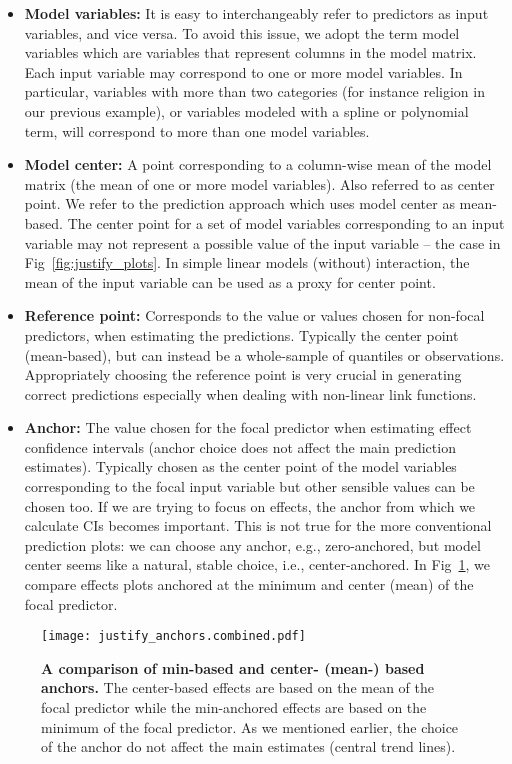 \begin{itemize}
\item \textbf{Model variables:} It is easy to interchangeably refer to predictors as input variables, and vice versa. To avoid this issue, we adopt the term model variables which are variables that represent columns in the model matrix. Each input variable may correspond to one or more model variables. In particular, variables with more than two categories (for instance religion in our previous example), or variables modeled with a spline or polynomial term, will correspond to more than one model variables.
\item \textbf{Model center:} A point corresponding to a column-wise mean of the model matrix (the mean of one or more model variables). Also referred to as center point. We refer to the prediction approach which uses model center as mean-based. The center point for a set of model variables corresponding to an input variable may not represent a possible value of the input variable -- the case in Fig~\ref{fig:justify_plots}. In simple linear models (without) interaction, the mean of the input variable can be used as a proxy for center point.
\item \textbf{Reference point:} Corresponds to the value or values chosen for non-focal predictors, when estimating the predictions. Typically the center point (mean-based), but can instead be a whole-sample of quantiles or observations. Appropriately choosing the reference point is very crucial in generating correct predictions especially when dealing with non-linear link functions.
\item \textbf{Anchor:} The value chosen for the focal predictor when estimating effect confidence intervals (anchor choice does not affect the main prediction estimates). Typically chosen as the center point of the model variables corresponding to the focal input variable but other sensible values can be chosen too. If we are trying to focus on effects, the anchor from which we calculate CIs becomes important. This is not true for the more conventional prediction plots: we can choose any anchor, e.g., zero-anchored, but model center seems like a natural, stable choice, i.e., center-anchored. In Fig~\ref{fig:justify_anchors}, we compare effects plots anchored at the minimum and center (mean) of the focal predictor.
\end{itemize}


\begin{figure}[h]
\begin{center}
\texttt{[image: justify\_anchors.combined.pdf]}
\end{center}
\caption{{\bf A comparison of min-based and center- (mean-) based anchors.} The center-based effects are based on the mean of the focal predictor while the min-anchored effects are based on the minimum of the focal predictor. As we mentioned earlier, the choice of the anchor do not affect the main estimates (central trend lines).} 
\label{fig:justify_anchors}
\end{figure}


